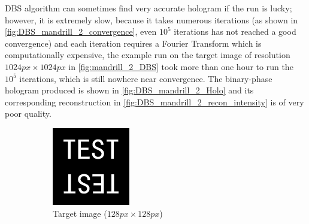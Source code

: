 DBS algorithm can sometimes find very accurate hologram if the run is lucky; however, it is extremely slow, because it takes numerous iterations (as shown in \cref{fig:DBS_mandrill_2_convergence}, even $10^5$ iterations has not reached a good convergence) and each iteration requires a Fourier Transform which is computationally expensive, the example run on the target image of resolution $1024 px\times 1024 px$ in \cref{fig:mandrill_2_DBS} took more than one hour to run the $10^5$ iterations, which is still nowhere near convergence. The binary-phase hologram produced is shown in \cref{fig:DBS_mandrill_2_Holo} and its corresponding reconstruction in \cref{fig:DBS_mandrill_2_recon_intensity} is of very poor quality.

\begin{figure}[H]
  \centering
  \begin{subfigure}[t]{0.3\textwidth}
    \centering
    \includegraphics[width=\textwidth]{test_128.png}
    \caption{Target image ($128 px\times 128 px$)}
    \label{fig:test_128}
  \end{subfigure}
  \hfill
  \begin{subfigure}[t]{0.3\textwidth}
    \centering

\end{subfigure}
\end{figure}
